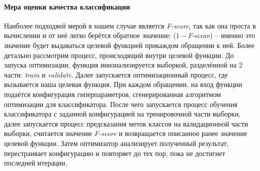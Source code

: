 \documentclass[times,specification,annotation]{itmo-student-thesis}
\begin{document}
		\paragraph{Мера оценки качества классификации} Наиболее подходяей мерой в нашем случае является \textit{F-score}, так как она проста в вычислении и от неё легко берётся обратное значение: ($1 - F$-score) -- именно это значение будет выдаваться целевой функцией прикаждом обращении к ней.
		Более детально рассмотрим процесс, происходящий внутри целевой функции. До запуска оптимизации, функция инизиализируется выборкой, разделённой на 2 части: \textit{train} и \textit{validate}. Далее запускается оптимизационный процесс, где вызывается наша целевая функция. При каждом обращении, на вход функции подаётся конфигурация гиперпараметров, сгенерированная алгоритмом оптимизации для классификатора. После чего запускается процесс обучения классификатора с заданной конфигурацией на тренировочной части выборки, далее запускается процесс предсказания меток классов на валидационной части выборки, считается значение \textit{F-score} и возвращается описанное ранее значение целевой функции. Затем оптимизатор анализирует полученный результат, перестраивает конфигурацию и повторяет до тех пор, пока не достигнет последней итерации.
\end{document}

